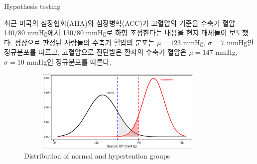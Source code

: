 \documentclass[9pt,ignorenonframetext,xcolor=dvipsnames]{beamer}
\begin{document}
\begin{frame}{Hypothesis testing}

\begin{tcolorbox}[colback=gray!10,colframe=black, title=\textbf{Example: blood pressure cutpoint}]
  \scriptsize  최근 미국의 심장협회(AHA)와 심장병학(ACC)가 고혈압의 기준을 수축기 혈압 140/80 mmHg에서 130/80 mmHg로 하향 조정한다는 내용을 현지 매체들이 보도했다. 정상으로 판정된 사람들의 수축기 혈압의 분포는 $\mu=123$ mmHg, $\sigma=7$ mmHg인 정규분포를 따르고, 고혈압으로 진단받은 환자의 수축기 혈압은  $\mu=147$ mmHg, $\sigma=10$ mmHg인 정규분포를 따른다. 
\end{tcolorbox}

\begin{figure}[H]

{\centering \includegraphics[width=10cm,height=4cm]{Figures/dist-2-1} 

}

\caption{Distribution of normal and hypertention groups}\label{fig:dist-2}
\end{figure}

\end{frame}
\end{document}
